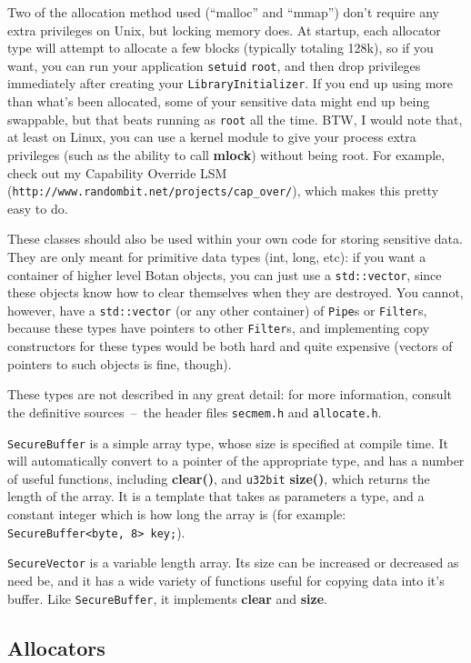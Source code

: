\documentclass{article}
\newcommand{\filename}[1]{\texttt{#1}}
\newcommand{\function}[1]{\textbf{#1}}
\newcommand{\type}[1]{\texttt{#1}}
\begin{document}
Two of the allocation method used (``malloc'' and ``mmap'') don't require any
extra privileges on Unix, but locking memory does. At startup, each allocator
type will attempt to allocate a few blocks (typically totaling 128k), so if you
want, you can run your application \texttt{setuid} \texttt{root}, and then drop
privileges immediately after creating your \type{LibraryInitializer}. If you
end up using more than what's been allocated, some of your sensitive data might
end up being swappable, but that beats running as \texttt{root} all the
time. BTW, I would note that, at least on Linux, you can use a kernel module to
give your process extra privileges (such as the ability to call
\function{mlock}) without being root. For example, check out my Capability
Override LSM (\texttt{http://www.randombit.net/projects/cap\_over/}), which
makes this pretty easy to do.

These classes should also be used within your own code for storing sensitive
data. They are only meant for primitive data types (int, long, etc): if you
want a container of higher level Botan objects, you can just use a
\verb|std::vector|, since these objects know how to clear themselves when they
are destroyed. You cannot, however, have a \verb|std::vector| (or any other
container) of \type{Pipe}s or \type{Filter}s, because these types have pointers
to other \type{Filter}s, and implementing copy constructors for these types
would be both hard and quite expensive (vectors of pointers to such objects is
fine, though).

These types are not described in any great detail: for more information,
consult the definitive sources~--~the header files \filename{secmem.h} and
\filename{allocate.h}.

\type{SecureBuffer} is a simple array type, whose size is specified at compile
time. It will automatically convert to a pointer of the appropriate type, and
has a number of useful functions, including \function{clear()}, and
\type{u32bit} \function{size()}, which returns the length of the array. It is a
template that takes as parameters a type, and a constant integer which is how
long the array is (for example: \verb|SecureBuffer<byte, 8> key;|).

\type{SecureVector} is a variable length array. Its size can be increased or
decreased as need be, and it has a wide variety of functions useful for copying
data into it's buffer. Like \type{SecureBuffer}, it implements \function{clear}
and \function{size}.

\subsection{Allocators}
\end{document}

